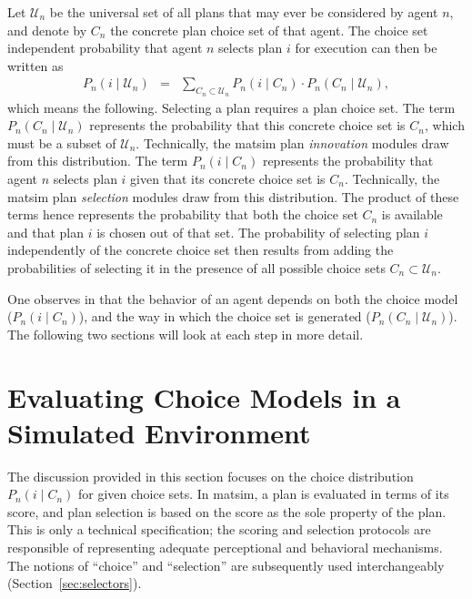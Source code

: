 Let $\mathcal{U}_n$ be the universal set of all plans that may ever be considered
by agent $n$, and denote by $C_{n}$ the concrete plan choice set
of that agent. The choice set independent probability that agent $n$
selects plan $i$ for execution can then be written as
\begin{eqnarray}
P_{n}(i\mid \mathcal{U}_n) & = & \sum_{C_{n}\subset \mathcal{U}_n}P_{n}(i\mid C_{n})\cdot P_{n}(C_{n}\mid \mathcal{U}_n),
\label{eq:unconditional-choice-proba}
\end{eqnarray}
which means the following. Selecting a plan requires a plan choice
set. The term $P_{n}(C_{n}\mid \mathcal{U}_n)$ represents the probability that
this concrete choice set is $C_{n}$, which must be a subset of $\mathcal{U}_n$.
Technically, the \gls{matsim} plan \emph{innovation} modules draw from this distribution.
The term $P_{n}(i\mid C_{n})$ represents the probability that agent
$n$ selects plan $i$ given that its concrete choice set is $C_{n}$.
Technically, the \gls{matsim} plan \emph{selection} modules draw from this distribution.
The product of these terms hence represents the probability that both
the choice set $C_{n}$ is available and that plan $i$ is chosen out
of that set. The probability of selecting plan $i$ independently
of the concrete choice set then results from adding the probabilities
of selecting it in the presence of all possible choice sets $C_{n}\subset \mathcal{U}_n$.

One observes in  that the behavior of an agent depends on both the choice model ($P_{n}(i\mid C_{n})$), and the way in which the choice set is generated ($P_{n}(C_{n}\mid \mathcal{U}_n)$). The following two sections will look at each step in more detail.

\section{\label{sec:Evaluating-choice-models}Evaluating Choice Models in
a Simulated Environment}

The discussion provided in this section focuses on the choice distribution
$P_{n}(i\mid C_{n})$ for given choice sets. In \gls{matsim}, a plan is
evaluated in terms of its score, and plan selection is based on the
score as the sole property of the plan. This is only a technical specification;
the scoring and selection protocols are responsible of representing
adequate perceptional and behavioral mechanisms. The notions of {}``choice''
and {}``selection'' are subsequently used interchangeably (\cf Section~\ref{sec:selectors}).

